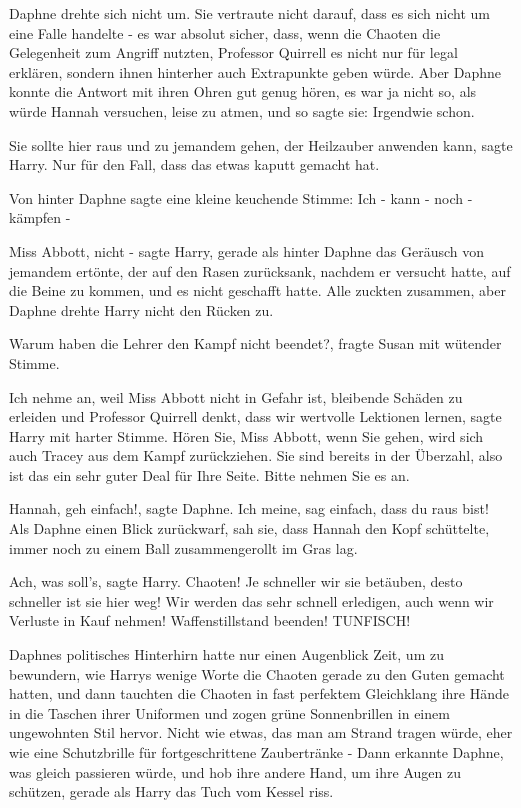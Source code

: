 Daphne drehte sich nicht um. Sie vertraute nicht darauf, dass es sich nicht um
eine Falle handelte - es war absolut sicher, dass, wenn die Chaoten die
Gelegenheit zum Angriff nutzten, Professor Quirrell es nicht nur für legal
erklären, sondern ihnen hinterher auch Extrapunkte geben würde. Aber Daphne
konnte die Antwort mit ihren Ohren gut genug hören, es war ja nicht so, als
würde Hannah versuchen, leise zu atmen, und so sagte sie: \glqq{}Irgendwie
schon.\grqq{}

\glqq{}Sie sollte hier raus und zu jemandem gehen, der Heilzauber anwenden
kann\grqq{}, sagte Harry. \glqq{}Nur für den Fall, dass das etwas kaputt gemacht
hat.\grqq{}

Von hinter Daphne sagte eine kleine keuchende Stimme: \glqq{}Ich - kann - noch -
kämpfen -\grqq{}

\glqq{}Miss Abbott, nicht -\grqq{} sagte Harry, gerade als hinter Daphne das
Geräusch von jemandem ertönte, der auf den Rasen zurücksank, nachdem er versucht
hatte, auf die Beine zu kommen, und es nicht geschafft hatte. Alle zuckten
zusammen, aber Daphne drehte Harry nicht den Rücken zu.

\glqq{}Warum haben die Lehrer den Kampf nicht beendet?\grqq{}, fragte Susan mit
wütender Stimme.

\glqq{}Ich nehme an, weil Miss Abbott nicht in Gefahr ist, bleibende Schäden zu
erleiden und Professor Quirrell denkt, dass wir wertvolle Lektionen
lernen\grqq{}, sagte Harry mit harter Stimme. \glqq{}Hören Sie, Miss Abbott, wenn
Sie gehen, wird sich auch Tracey aus dem Kampf zurückziehen. Sie sind bereits in
der Überzahl, also ist das ein sehr guter Deal für Ihre Seite. Bitte nehmen Sie
es an.\grqq{}

\glqq{}Hannah, geh einfach!\grqq{}, sagte Daphne. \glqq{}Ich meine, sag einfach,
dass du raus bist!\grqq{} Als Daphne einen Blick zurückwarf, sah sie, dass
Hannah den Kopf schüttelte, immer noch zu einem Ball zusammengerollt im Gras
lag.

\glqq{}Ach, was soll's\grqq{}, sagte Harry. \glqq{}Chaoten! Je schneller wir sie
betäuben, desto schneller ist sie hier weg! Wir werden das sehr schnell
erledigen, auch wenn wir Verluste in Kauf nehmen! Waffenstillstand beenden!
TUNFISCH!\grqq{}

Daphnes politisches Hinterhirn hatte nur einen Augenblick Zeit, um zu bewundern,
wie Harrys wenige Worte die Chaoten gerade zu den Guten gemacht hatten, und dann
tauchten die Chaoten in fast perfektem Gleichklang ihre Hände in die Taschen
ihrer Uniformen und zogen grüne Sonnenbrillen in einem ungewohnten Stil hervor.
Nicht wie etwas, das man am Strand tragen würde, eher wie eine Schutzbrille für
fortgeschrittene Zaubertränke - Dann erkannte Daphne, was gleich passieren
würde, und hob ihre andere Hand, um ihre Augen zu schützen, gerade als Harry das
Tuch vom Kessel riss.

